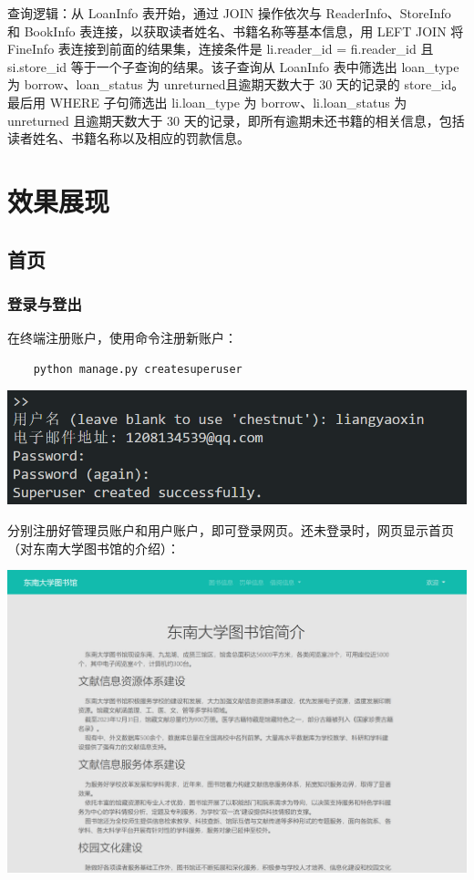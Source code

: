 \documentclass[a4paper,14pt]{article}
\begin{document}
查询逻辑：从 LoanInfo 表开始，通过 JOIN 操作依次与 ReaderInfo、StoreInfo 和 BookInfo 表连接，以获取读者姓名、书籍名称等基本信息，用 LEFT JOIN 将 FineInfo 表连接到前面的结果集，连接条件是 li.reader\_id = fi.reader\_id 且 si.store\_id 等于一个子查询的结果。该子查询从 LoanInfo 表中筛选出 loan\_type 为 borrow、loan\_status 为 unreturned且逾期天数大于 30 天的记录的 store\_id。最后用 WHERE 子句筛选出 li.loan\_type 为 borrow、li.loan\_status 为 unreturned 且逾期天数大于 30 天的记录，即所有逾期未还书籍的相关信息，包括读者姓名、书籍名称以及相应的罚款信息。

\section{效果展现}
\subsection{首页}
\subsubsection{登录与登出}
在终端注册账户，使用命令注册新账户：
\begin{lstlisting}
    python manage.py createsuperuser
\end{lstlisting}


\begin{center}
    \includegraphics[width=0.3\linewidth]{images/login.png}\end{center}



分别注册好管理员账户和用户账户，即可登录网页。还未登录时，网页显示首页（对东南大学图书馆的介绍）：

\vspace{10pt}
\begin{center}
    \includegraphics[width=0.8\linewidth]{images/index1.png}\end{center}
\vspace{5pt}
\end{document}
